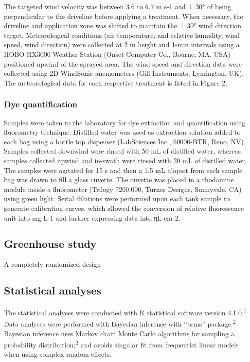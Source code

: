 \documentclass[
  12pt,
  a4paper,
]{article}
\begin{document}
The targeted wind velocity was between 3.6 to 6.7 m s-1 and ± 30° of
being perpendicular to the driveline before applying a treatment. When
necessary, the driveline and application zone was shifted to maintain
the ± 30° wind direction target. Meteorological conditions (air
temperature, and relative humidity, wind speed, wind direction) were
collected at 2 m height and 1-min intervals using a HOBO RX3000 Weather
Station (Onset Computer Co., Bourne, MA, USA) positioned upwind of the
sprayed area. The wind speed and direction data were collected using 2D
WindSonic anemometers (Gill Instruments, Lymington, UK). The
meteorological data for each respective treatment is listed in Figure 2.

\hypertarget{dye-quantification}{%
\subsubsection{Dye quantification}\label{dye-quantification}}

Samples were taken to the laboratory for dye extraction and
quantification using fluorometry technique. Distilled water was used as
extraction solution added to each bag using a bottle top dispenser
(LabSciences Inc., 60000-BTR, Reno, NV). Samples collected downwind were
rinsed with 50 mL of distilled water, whereas samples collected upwind
and in-swath were rinsed with 20 mL of distilled water. The samples were
agitated for 15 s and then a 1.5 mL aliquot from each sample bag was
drawn to fill a glass cuvette. The cuvette was placed in a rhodamine
module inside a fluorometer (Trilogy 7200.000, Turner Designs,
Sunnyvale, CA) using green light. Serial dilutions were performed upon
each tank sample to generate calibration curves, which allowed the
conversion of relative fluorescence unit into mg L-1 and further
expressing data into ɳL cm-2.

\hypertarget{greenhouse-study}{%
\subsection{Greenhouse study}\label{greenhouse-study}}

A completely randomized design

\hypertarget{statistical-analyses}{%
\subsection{Statistical analyses}\label{statistical-analyses}}

The statistical analyses were conducted with R statistical software
version 4.1.0.\textsuperscript{1} Data analyses were performed with
Bayesian inference with ``brms'' package.\textsuperscript{2} Bayesian
inference uses Markov chain Monte Carlo algorithms for sampling a
probability distribution;\textsuperscript{2} and avoids singular fit
from frequentist linear models when using complex random effects.
\end{document}
